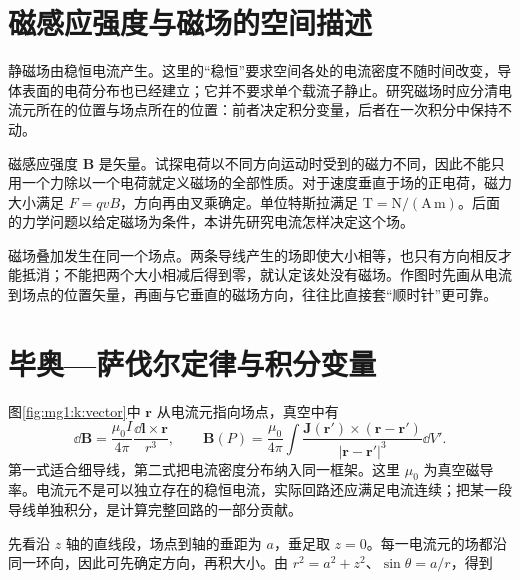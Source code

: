 \section{磁感应强度与磁场的空间描述}
静磁场由稳恒电流产生。这里的“稳恒”要求空间各处的电流密度不随时间改变，导体表面的电荷分布也已经建立；它并不要求单个载流子静止。研究磁场时应分清电流元所在的位置与场点所在的位置：前者决定积分变量，后者在一次积分中保持不动。


磁感应强度 $\bm B$ 是矢量。试探电荷以不同方向运动时受到的磁力不同，因此不能只用一个力除以一个电荷就定义磁场的全部性质。对于速度垂直于场的正电荷，磁力大小满足 $F=qvB$，方向再由叉乘确定。单位特斯拉满足 $\mathrm T=\mathrm{N/(A\,m)}$。后面的力学问题以给定磁场为条件，本讲先研究电流怎样决定这个场。


磁场叠加发生在同一个场点。两条导线产生的场即使大小相等，也只有方向相反才能抵消；不能把两个大小相减后得到零，就认定该处没有磁场。作图时先画从电流到场点的位置矢量，再画与它垂直的磁场方向，往往比直接套“顺时针”更可靠。

\section{毕奥—萨伐尔定律与积分变量}
图\ref{fig:mg1:k:vector}中 $\bm r$ 从电流元指向场点，真空中有
\begin{equation}\dd\bm B=\frac{\mu_0 I}{4\pi}\frac{\dd\bm l\times\bm r}{r^3},
\qquad \bm B(P)=\frac{\mu_0}{4\pi}\int\frac{\bm J(\bm r')\times(\bm r-\bm r')}{|\bm r-\bm r'|^3}\dd V'.\end{equation}
第一式适合细导线，第二式把电流密度分布纳入同一框架。这里 $\mu_0$ 为真空磁导率。电流元不是可以独立存在的稳恒电流，实际回路还应满足电流连续；把某一段导线单独积分，是计算完整回路的一部分贡献。


先看沿 $z$ 轴的直线段，场点到轴的垂距为 $a$，垂足取 $z=0$。每一电流元的场都沿同一环向，因此可先确定方向，再积大小。由 $r^2=a^2+z^2$、$\sin\theta=a/r$，得到

